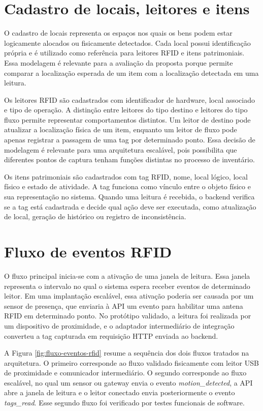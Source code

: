 

\section{Cadastro de locais, leitores e itens}

O cadastro de locais representa os espaços nos quais os bens podem estar logicamente alocados ou fisicamente detectados. Cada local possui identificação própria e é utilizado como referência para leitores RFID e itens patrimoniais. Essa modelagem é relevante para a avaliação da proposta porque permite comparar a localização esperada de um item com a localização detectada em uma leitura.

Os leitores RFID são cadastrados com identificador de hardware, local associado e tipo de operação. A distinção entre leitores do tipo destino e leitores do tipo fluxo permite representar comportamentos distintos. Um leitor de destino pode atualizar a localização física de um item, enquanto um leitor de fluxo pode apenas registrar a passagem de uma tag por determinado ponto. Essa decisão de modelagem é relevante para uma arquitetura escalável, pois possibilita que diferentes pontos de captura tenham funções distintas no processo de inventário.

Os itens patrimoniais são cadastrados com tag RFID, nome, local lógico, local físico e estado de atividade. A tag funciona como vínculo entre o objeto físico e sua representação no sistema. Quando uma leitura é recebida, o backend verifica se a tag está cadastrada e decide qual ação deve ser executada, como atualização de local, geração de histórico ou registro de inconsistência.

\section{Fluxo de eventos RFID}

O fluxo principal inicia-se com a ativação de uma janela de leitura. Essa janela representa o intervalo no qual o sistema espera receber eventos de determinado leitor. Em uma implantação escalável, essa ativação poderia ser causada por um sensor de presença, que enviaria à API um evento para habilitar uma antena RFID em determinado ponto. No protótipo validado, a leitura foi realizada por um dispositivo de proximidade, e o adaptador intermediário de integração converteu a tag capturada em requisição HTTP enviada ao backend.

A Figura \ref{fig:fluxo-eventos-rfid} resume a sequência dos dois fluxos tratados na arquitetura. O primeiro corresponde ao fluxo validado fisicamente com leitor USB de proximidade e comunicador intermediário. O segundo corresponde ao fluxo escalável, no qual um sensor ou gateway envia o evento \textit{motion\_detected}, a API abre a janela de leitura e o leitor conectado envia posteriormente o evento \textit{tags\_read}. Esse segundo fluxo foi verificado por testes funcionais de software.


